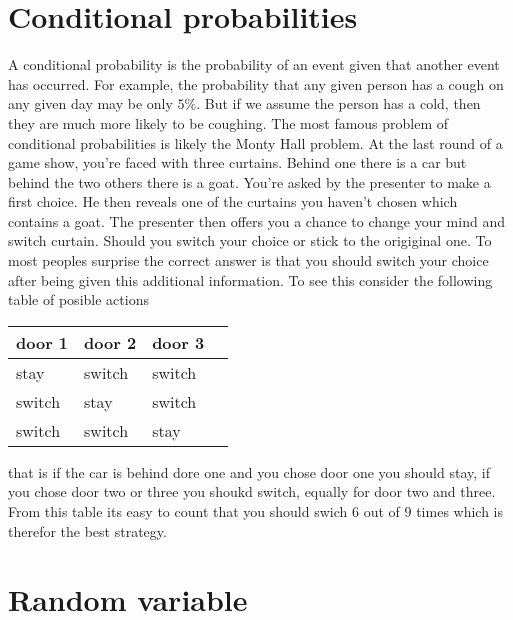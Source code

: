 \section{Conditional probabilities}
A conditional probability is the probability of an event given that another event has occurred. For example, the probability that any given person has a cough on any given day may be only $5\%$. But if we assume the person has a cold, then they are much more likely to be coughing. The most famous problem of conditional probabilities is likely the Monty Hall problem. At the last round of a game show, you’re faced with three curtains. Behind one there is a car but behind the two others there is a goat. You’re asked by the presenter to make a first choice. He then reveals one of the curtains you haven’t chosen which contains a goat. The presenter then offers you a chance to change your mind and switch curtain. Should you switch your choice or stick to the origiginal one. To most peoples surprise the correct answer is that you should switch your choice after being given this additional information. To see this consider the following table of posible actions
\begin{table}[H]
\centering
\begin{tabular}{|l|l|l|l|}
\hline
\textbf{door 1} & \textbf{door 2} & \textbf{door 3} \\ \hline
stay            & switch          & switch          \\ \hline
switch          & stay            & switch          \\ \hline
switch          & switch          & stay            \\ \hline
\end{tabular}
\end{table}
that is if the car is behind dore one and you chose door one you should stay, if you chose door two or three you shoukd switch, equally for door two and three. From this table its easy to count that you should swich $6$ out of $9$ times which is therefor the best strategy.


\section{Random variable}
